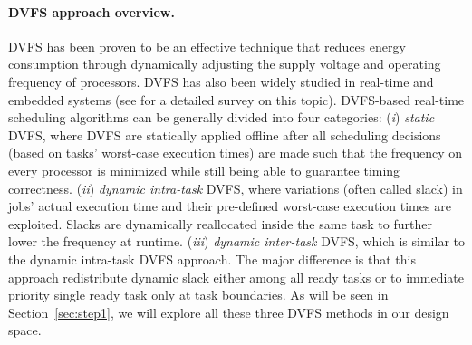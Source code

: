 \paragraph{DVFS approach overview.} DVFS has been proven to be an effective technique that reduces energy consumption through dynamically adjusting the supply voltage and operating frequency of processors. DVFS has also been widely studied in real-time and embedded systems (see \cite{bhatti2011energy} for a detailed survey on this topic). DVFS-based real-time scheduling algorithms can be generally divided into four categories: (\textit{i}) \textit{static} DVFS, where DVFS are statically applied offline after all scheduling decisions (based on tasks' worst-case execution times) are made such that the frequency on every processor is minimized while still being able to guarantee timing correctness. (\textit{ii}) \textit{dynamic intra-task} DVFS, where variations (often called slack) in jobs' actual execution time and their pre-defined worst-case execution times are exploited. Slacks are dynamically reallocated inside the same task to further lower the frequency at runtime. (\textit{iii}) \textit{dynamic inter-task} DVFS, which is similar to the dynamic intra-task DVFS approach. The major difference is that this approach redistribute dynamic slack either among all ready tasks or to immediate priority single ready task only at task boundaries.
 As will be seen in Section~\ref{sec:step1}, we will explore all these three DVFS methods in our design space.



